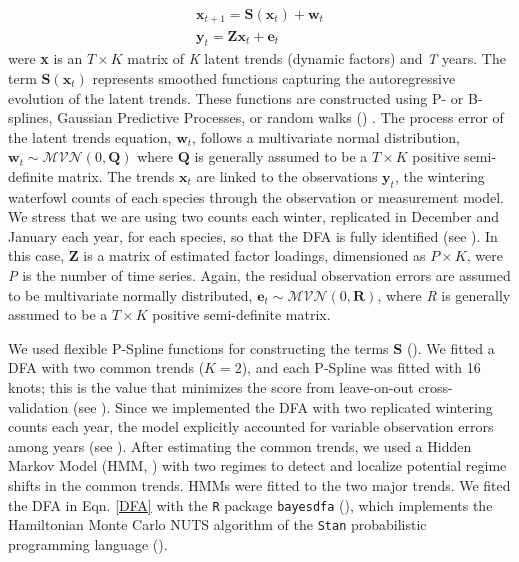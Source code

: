 \documentclass[12pt]{article}
\begin{document}
\begin{equation}\label{DFA}
	\begin{split}
		\textbf{x}_{t+1} = \mathbf{S}(\textbf{x}_{t}) + \textbf{w}_{t}\\
		\textbf{y}_{t} = \textbf{Zx}_{t} + \textbf{e}_{t}
	\end{split}
\end{equation}
were \textbf{x} is an $ T \times K $ matrix of \textit{K} latent trends (dynamic factors) and \textit{T} years. The term $\mathbf{S}(\textbf{x}_{t})$ represents smoothed functions capturing the autoregressive evolution of the latent trends. These functions are constructed using P- or B-splines, Gaussian Predictive Processes, or random walks (\cite{Ward2022}) . The process error of the latent trends equation, $ \textbf{w}_{t} $, follows a multivariate normal distribution, $ \textbf{w}_{t} \sim \mathcal{MVN}(0,\textbf{Q}) $ where $\textbf{Q}$ is generally assumed to be a $ T \times K $ positive semi-definite matrix. The trends $ \textbf{x}_{t} $ are linked to the observations $ \textbf{y}_{t} $, the wintering waterfowl counts of each species through the observation or measurement model. We stress that we are using two counts each winter, replicated in December and January each year, for each species, so that the DFA is fully identified (see \cite{Almaraz2011,Almaraz2012,Ward2022}). In this case, \textbf{Z} is a matrix of estimated factor loadings, dimensioned as $ P \times K $, were \textit{P} is the number of time series. Again, the residual observation errors are assumed to be multivariate normally distributed, $ \textbf{e}_{t} \sim \mathcal{MVN}(0,\textbf{R}) $, where \textit{R} is generally assumed to be a $ T \times K $ positive semi-definite matrix.

We used flexible P-Spline functions for constructing the terms $ \mathbf{S} $ (\cite{Eilers1996,Ward2022}). We fitted a DFA with two common trends ($ K = 2 $), and each P-Spline was fitted with 16 knots; this is the value that minimizes the score from leave-on-out cross-validation (see \cite{Ward2022}). Since we implemented the DFA with two replicated wintering counts each year, the model explicitly accounted for variable observation errors among years (see \cite{Ward2022}). After estimating the common trends, we used a Hidden Markov Model (HMM, \cite{Fraser2008}) with two regimes to detect and localize potential regime shifts in the common trends. HMMs were fitted to the two major trends. We fited the DFA in Eqn. \ref{DFA} with the \verb|R| package \verb|bayesdfa| (\cite{Ward2022}), which implements the Hamiltonian Monte Carlo NUTS algorithm of the \verb|Stan| probabilistic programming language (\cite{Carpenter2017}).\\
\end{document}
